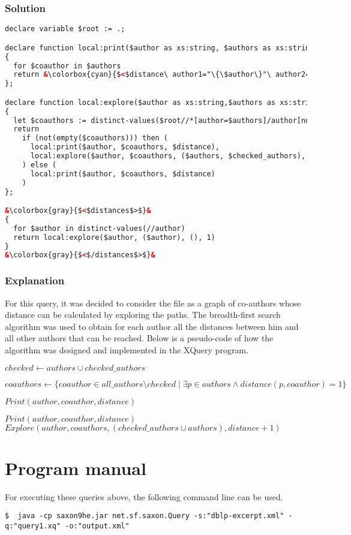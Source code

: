 \documentclass{article}
\begin{document}
\subsubsection{Solution}
\begin{lstlisting}[language=xml, frame=none, escapechar=&]
declare variable $root := .;

declare function local:print($author as xs:string, $authors as xs:string*, $distance as xs:integer)
{
  for $coauthor in $authors
  return &\colorbox{cyan}{$<$distance\ author1="\{\$author\}"\ author2="\{\$coauthor\}"\ distance="\{\$distance\}"/$>$}&
};

declare function local:explore($author as xs:string,$authors as xs:string*, $checked_authors as xs:string*, $distance as xs:integer)
{
  let $coauthors := distinct-values($root//*[author=$authors]/author[not(.=($authors,$checked_authors))])
  return
    if (not(empty($coauthors))) then (
      local:print($author, $coauthors, $distance),
      local:explore($author, $coauthors, ($authors, $checked_authors), $distance+1)
    ) else (
      local:print($author, $coauthors, $distance)
    )
};

&\colorbox{gray}{$<$distances$>$}&
{
  for $author in distinct-values(//author)
  return local:explore($author, ($author), (), 1)
}
&\colorbox{gray}{$<$/distances$>$}&
\end{lstlisting}
\subsubsection{Explanation}

For this query, it was decided to consider the file as a graph of co-authors whose distance can be calculated by exploring the paths. The breadth-first search algorithm was used to obtain for each author all the distances between him and all other authors that can be reached. Below is a pseudo-code of how the algorithm was designed and implemented in the XQuery program. 

\begin{algorithm}[H]
\caption{$Explore(author, authors, checked\_authors, distance)$}
\begin{algorithmic}

\STATE $checked \gets authors \cup checked\_authors$

\STATE $coauthors \gets \{coauthor \in all\_authors \setminus checked \mid \exists p \in authors \wedge distance(p, coauthor) = 1\}$

        \STATE $Print(author, coauthor, distance)$
    \ENDFOR

\ELSE
        \STATE $Print(author, coauthor, distance)$
    \ENDFOR
    \STATE $Explore(author, coauthors, (checked\_authors \cup authors), distance + 1)$
\ENDIF

\end{algorithmic}
\end{algorithm}

\section{Program manual}

For executing these queries above, the following command line can be used.

\begin{lstlisting}[frame=lines]
    $  java -cp saxon9he.jar net.sf.saxon.Query -s:"dblp-excerpt.xml" -q:"query1.xq" -o:"output.xml"
\end{lstlisting}
\end{document}
